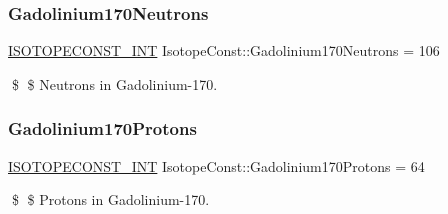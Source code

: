 \subsubsection{\texorpdfstring{Gadolinium170\+Neutrons}{Gadolinium170Neutrons}}
{\footnotesize\ttfamily \mbox{\hyperlink{group___isotope_const-_macros_ga5f18360b3e99483a35c32d789e62621c}{I\+S\+O\+T\+O\+P\+E\+C\+O\+N\+S\+T\+\_\+\+I\+NT}} Isotope\+Const\+::\+Gadolinium170\+Neutrons = 106}

\$ \$ Neutrons in Gadolinium-\/170. \mbox{\label{group___isotope_const-_gadolinium-_gd170_gacb1a8d3c1f3ab09aabf168ebae37aeb9}} 
\subsubsection{\texorpdfstring{Gadolinium170\+Protons}{Gadolinium170Protons}}
{\footnotesize\ttfamily \mbox{\hyperlink{group___isotope_const-_macros_ga5f18360b3e99483a35c32d789e62621c}{I\+S\+O\+T\+O\+P\+E\+C\+O\+N\+S\+T\+\_\+\+I\+NT}} Isotope\+Const\+::\+Gadolinium170\+Protons = 64}

\$ \$ Protons in Gadolinium-\/170. 